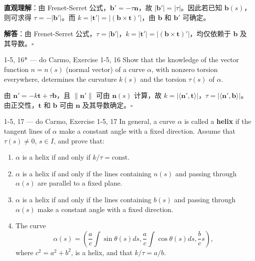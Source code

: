 \begin{solution}
\textbf{直观理解}：由 Frenet-Serret 公式，$\mathbf{b}' = -\tau\mathbf{n}$，故 $|\mathbf{b}'| = |\tau|$。因此若已知 $\mathbf{b}(s)$，则可求得 $\tau = -|\mathbf{b}'|$。而 $k = |\mathbf{t}'| = |(\mathbf{b}\times\mathbf{t})'|$，由 $\mathbf{b}$ 和 $\mathbf{b}'$ 可确定。

\textbf{解答}：由 Frenet-Serret 公式，$\tau = |\mathbf{b}'|$，$k = |\mathbf{t}'| = |(\mathbf{b}\times\mathbf{t})'|$，均仅依赖于 $\mathbf{b}$ 及其导数。$\square$
\end{solution}

\begin{exercise}{1-5, 16* — do Carmo, Exercise 1-5, 16}
Show that the knowledge of the vector function $n = n(s)$ (normal vector) of a curve $\alpha$, with nonzero torsion everywhere, determines the curvature $k(s)$ and the torsion $\tau(s)$ of $\alpha$.
\end{exercise}

\begin{solution}
由 $\mathbf{n}' = -k\mathbf{t} + \tau\mathbf{b}$，且 $\|\mathbf{n}'\|$ 可由 $\mathbf{n}(s)$ 计算，故 $k = |\langle\mathbf{n}', \mathbf{t}\rangle|$，$\tau = |\langle\mathbf{n}', \mathbf{b}\rangle|$。由正交性，$\mathbf{t}$ 和 $\mathbf{b}$ 可由 $\mathbf{n}$ 及其导数确定。$\square$
\end{solution}

\begin{exercise}{1-5, 17 — do Carmo, Exercise 1-5, 17}
In general, a curve $\alpha$ is called a \textbf{helix} if the tangent lines of $\alpha$ make a constant angle with a fixed direction. Assume that $\tau(s) \neq 0$, $s \in I$, and prove that:
\begin{enumerate}
\item[a.] $\alpha$ is a helix if and only if $k/\tau = \mathrm{const}$.
\item[b.] $\alpha$ is a helix if and only if the lines containing $n(s)$ and passing through $\alpha(s)$ are parallel to a fixed plane.
\item[c.*] $\alpha$ is a helix if and only if the lines containing $b(s)$ and passing through $\alpha(s)$ make a constant angle with a fixed direction.
\item[d.] The curve
\[
\alpha(s) = \left(\frac{a}{c}\int\sin\theta(s) ds, \frac{a}{c}\int\cos\theta(s) ds, \frac{b}{c}s\right),
\]
where $c^2 = a^2 + b^2$, is a helix, and that $k/\tau = a/b$.
\end{enumerate}
\end{exercise}

